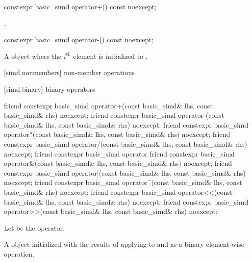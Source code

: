 \begin{itemdecl}
constexpr basic_simd operator+() const noexcept;
\end{itemdecl}

\begin{itemdescr}
  \pnum{}

  \pnum\returns
  .
\end{itemdescr}

\begin{itemdecl}
constexpr basic_simd operator-() const noexcept;
\end{itemdecl}

\begin{itemdescr}
  \pnum{}

  \pnum\returns
  A  object where the $i^\text{th}$ element is initialized to  \foralli.
\end{itemdescr}

[simd.nonmembers]{ non-member operations}

[simd.binary]{ binary operators}

\begin{itemdecl}
friend constexpr basic_simd operator+(const basic_simd& lhs, const basic_simd& rhs) noexcept;
friend constexpr basic_simd operator-(const basic_simd& lhs, const basic_simd& rhs) noexcept;
friend constexpr basic_simd operator*(const basic_simd& lhs, const basic_simd& rhs) noexcept;
friend constexpr basic_simd operator/(const basic_simd& lhs, const basic_simd& rhs) noexcept;
friend constexpr basic_simd operator%
friend constexpr basic_simd operator&(const basic_simd& lhs, const basic_simd& rhs) noexcept;
friend constexpr basic_simd operator|(const basic_simd& lhs, const basic_simd& rhs) noexcept;
friend constexpr basic_simd operator^(const basic_simd& lhs, const basic_simd& rhs) noexcept;
friend constexpr basic_simd operator<<(const basic_simd& lhs, const basic_simd& rhs) noexcept;
friend constexpr basic_simd operator>>(const basic_simd& lhs, const basic_simd& rhs) noexcept;
\end{itemdecl}

\begin{itemdescr}
  \pnum Let \op{} be the operator.

  \pnum\ConstraintOperatorTWellFormed

  \pnum\returns
  A  object initialized with the results of applying \op{} to  and  as a binary element-wise operation.
\end{itemdescr}

